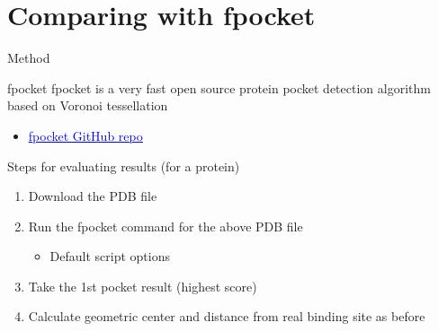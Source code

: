 \documentclass{beamer}
\newcommand{\link}[2]{\href{#1}{\textcolor{blue}{\underline{#2}}}}
\begin{document}
\section{Comparing with fpocket}

\begin{frame}{Method}
  \begin{block}{fpocket}
    fpocket is a very fast open source protein pocket detection algorithm based on Voronoi tessellation
    \begin{itemize}
      \item \link{https://github.com/Discngine/fpocket}{fpocket GitHub repo}
    \end{itemize}
  \end{block}
  \begin{block}{Steps for evaluating results (for a protein)}
    \begin{enumerate}
      \item Download the PDB file
      \item Run the fpocket command for the above PDB file
      \begin{itemize}
        \item Default script options
      \end{itemize}
      \item Take the 1st pocket result (highest score)
      \item Calculate geometric center and distance from real binding site as before
    \end{enumerate}
  \end{block}
\end{frame}
\end{document}
